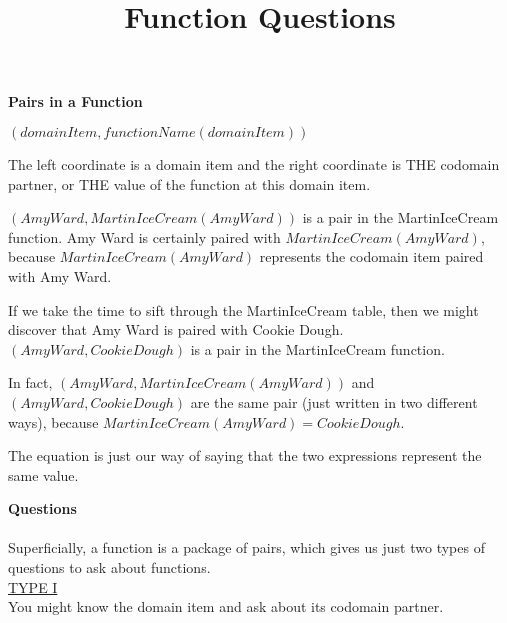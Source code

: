 \documentclass{ximera}
\title{Function Questions}
\begin{document}
\begin{abstract}
\end{abstract}

\maketitle





\textbf{Pairs in a Function} \\


\begin{center}
\textbf{$(domainItem, functionName(domainItem))$}
\end{center}

The left coordinate is a domain item and the right coordinate is THE codomain partner, or THE value of the function at this domain item.
\quad \\

\begin{example}
$(Amy Ward, MartinIceCream(Amy Ward))$ is a pair in the MartinIceCream function. Amy Ward is certainly paired with $MartinIceCream(Amy Ward)$, because $MartinIceCream(Amy Ward)$ represents the codomain item paired with Amy Ward.

If we take the time to sift through the MartinIceCream table, then we might discover that Amy Ward is paired with Cookie Dough.  $(Amy Ward, Cookie Dough)$ is a pair in the MartinIceCream function. 

In fact, $(Amy Ward, MartinIceCream(Amy Ward))$ and $(Amy Ward, Cookie Dough)$ are the same pair (just written in two different ways), because $MartinIceCream(Amy Ward) = Cookie Dough$.

The equation is just our way of saying that the two expressions represent the same value.        

\end{example}






\textbf{Questions} \\
\quad \\

Superficially, a function is a package of pairs, which gives us just two types of questions to ask about functions.
\quad \\

\underline{TYPE I} \\
You might know the domain item and ask about its codomain partner. 
\end{document}
